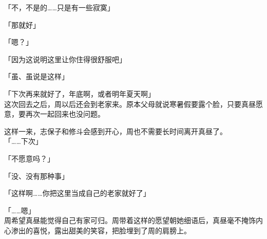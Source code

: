 「不，不是的……只是有一些寂寞」

「那就好」

「嗯？」

「因为这说明这里让你住得很舒服吧」

「虽、虽说是这样」

「下次再来就好了，年底啊，或者明年夏天啊」\\

这次回去之后，周以后还会到老家来。原本父母就说寒暑假要露个脸，只要真昼愿意，要再次一起回来也没问题。

这样一来，志保子和修斗会感到开心，周也不需要长时间离开真昼了。\\

「……下次」

「不愿意吗？」

「没、没有那种事」

「这样啊……你把这里当成自己的老家就好了」

「……嗯」\\

周希望真昼能觉得自己有家可归。周带着这样的愿望朝她细语后，真昼毫不掩饰内心渗出的喜悦，露出甜美的笑容，把脸埋到了周的肩膀上。
